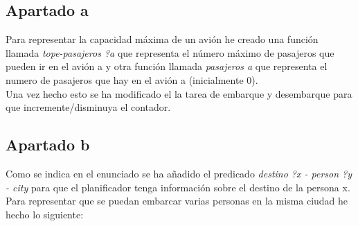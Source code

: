 \documentclass[10pt,spanish]{article}
\begin{document}
	\subsection*{Apartado a}
	Para representar la capacidad máxima de un avión he creado una función llamada \textit{tope-pasajeros ?a } que representa el número máximo de pasajeros que pueden ir en el avión a y otra función llamada \textit{pasajeros a} que representa el numero de pasajeros que hay en el avión a (inicialmente 0).\\
	Una vez hecho esto se ha modificado el la tarea de embarque y desembarque para que incremente/disminuya el contador. 
	\subsection*{Apartado b}
	Como se indica en el enunciado se ha añadido el predicado \textit{destino ?x - person ?y - city} para que el planificador tenga información sobre el destino de la persona x.\\
	Para representar que se puedan embarcar varias personas en la misma ciudad he hecho lo siguiente: \\
\end{document}
